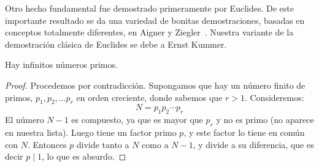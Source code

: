   Otro hecho fundamental fue demostrado primeramente por Euclides.%
  De este importante resultado se da una variedad de bonitas demostraciones,
  basadas en conceptos totalmente diferentes,
  en Aigner y Ziegler~\cite{aigner14:_proof_the_book}.
  Nuestra variante de la demostración clásica de Euclides
  se debe a Ernst Kummer.%
  \begin{theorem}
    \label{theo:infinitos-primos}
    Hay infinitos números primos.
  \end{theorem}
  \begin{proof}
    Procedemos por contradicción.%
    Supongamos que hay un número finito de primos,
    \(p_1, p_2, \dotsc p_r\) en orden creciente,
    donde sabemos que \(r > 1\).
    Consideremos:
    \begin{equation*}
      N = p_1 p_2 \dotsm p_r
    \end{equation*}
    El número \(N - 1\) es compuesto,
    ya que es mayor que \(p_r\) y no es primo
    (no aparece en nuestra lista).
    Luego tiene un factor primo \(p\),
    y este factor lo tiene en común con \(N\).
    Entonces \(p\) divide tanto a \(N\) como a \(N - 1\),
    y divide a su diferencia,
    que es decir \(p \mid 1\),
    lo que es absurdo.
  \end{proof}

